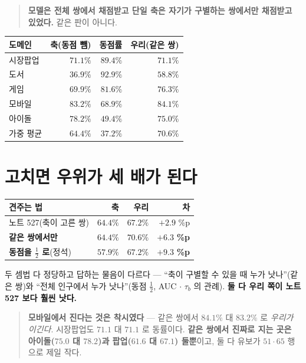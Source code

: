\documentclass[11pt]{article}
\begin{document}
\begin{quote}
\textbf{모델은 전체 쌍에서 채점받고 단일 축은 자기가 구별하는 쌍에서만
채점받고 있었다.} 같은 판이 아니다.
\end{quote}

\begin{center}
\begin{tabular}{lrrr}
\hline
도메인 & 축(동점 뺌) & \textbf{동점률} & 우리(같은 쌍) \\
\hline
시장팝업 & $71.1\%$ & $\mathbf{89.4\%}$ & $71.1\%$ \\
도서 & $36.9\%$ & $\mathbf{92.9\%}$ & $58.8\%$ \\
게임 & $69.9\%$ & $81.6\%$ & $76.3\%$ \\
모바일 & $83.2\%$ & $68.9\%$ & $\mathbf{84.1\%}$ \\
아이돌 & $78.2\%$ & $49.4\%$ & $75.0\%$ \\
\hline
가중 평균 & $64.4\%$ & $\mathbf{37.2\%}$ & $\mathbf{70.6\%}$ \\
\hline
\end{tabular}
\end{center}

\section{고치면 우위가 세 배가 된다}

\begin{center}
\begin{tabular}{lrrr}
\hline
견주는 법 & 축 & 우리 & 차 \\
\hline
노트 527(축이 고른 쌍) & $64.4\%$ & $67.2\%$ & $+2.9$ \%p \\
\textbf{같은 쌍에서만} & $64.4\%$ & $\mathbf{70.6\%}$ & $\mathbf{+6.3}$ \textbf{\%p} \\
\textbf{동점을 $\frac{1}{2}$ 로}(정석) & $\mathbf{57.9\%}$ & $67.2\%$ & $\mathbf{+9.3}$ \textbf{\%p} \\
\hline
\end{tabular}
\end{center}

두 셈법 다 정당하고 답하는 물음이 다르다 --- ``축이 구별할 수 있을 때 누가
낫나''(같은 쌍)와 ``전체 인구에서 누가 낫나''(동점 $\frac{1}{2}$, AUC $\cdot$
$\tau_b$ 의 관례). \textbf{둘 다 우리 쪽이 노트 527 보다 훨씬 낫다.}

\begin{quote}
\textbf{모바일에서 진다는 것은 착시였다} --- 같은 쌍에서 $84.1\%$ 대
$83.2\%$ 로 \emph{우리가 이긴다}. 시장팝업도 $71.1$ 대 $71.1$ 로 동률이다.
\textbf{같은 쌍에서 진짜로 지는 곳은 아이돌($75.0$ 대 $78.2$)과
팝업($61.6$ 대 $67.1$) 둘뿐}이고, 둘 다 유보가 $51 \cdot 65$ 행으로 제일 작다.
\end{quote}
\end{document}
